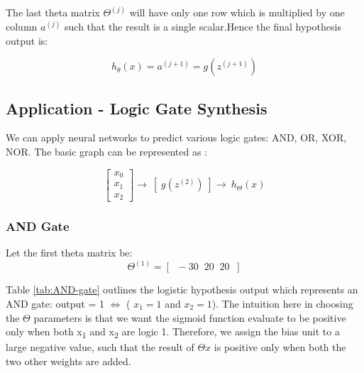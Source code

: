                 The last theta matrix $\Theta^{(j)}$ will have only one row which is multiplied by one column $a^{(j)}$ such that the result is a single scalar.Hence the final hypothesis output is:

                \begin{equation}
                    h_\theta (x) = a^{(j+1)} = g (z^{(j+1)})
                    \label{eq:neural-hypothesis}
                \end{equation}



                


    \subsection{Application - Logic Gate Synthesis}
        We can apply neural networks to predict various logic gates: AND, OR, XOR, NOR.
        The basic graph can be represented as :

        \[
        \begin{bmatrix}
             x_0 \\
             x_1 \\
             x_2
        \end{bmatrix}
        \rightarrow \:
        [\; g (z^{(2)})\;]
        \rightarrow \:
        h_\Theta (x)
        \] 
       



        \subsubsection{AND Gate}
            Let the first theta matrix be:
            \[
                \Theta^{(1)} = [\;\;-30 \;\; 20 \;\; 20 \;\;]
            \] 
          
            Table \ref{tab:AND-gate} outlines the logistic hypothesis output which represents an AND gate: output = 1 $\iff$ ( $x_1=1$ and $x_2 = 1$). The intuition here in choosing the $\Theta$ parameters is that we want the sigmoid function evaluate to be positive only when both x\textsubscript{1} and x\textsubscript{2} are logic 1. Therefore, we assign the bias unit to a large negative value, such that the result of $\Theta x$ is positive only when both the two other weights are added. 

